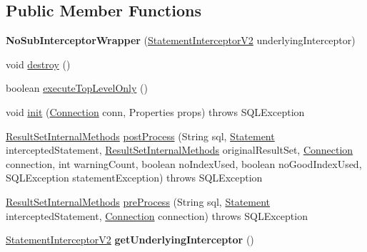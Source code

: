 \subsection*{Public Member Functions}
\begin{DoxyCompactItemize}
\item 
\mbox{\label{classcom_1_1mysql_1_1jdbc_1_1_no_sub_interceptor_wrapper_ac09c0d07ac9710d9d883a85132b03ec1}} 
{\bfseries No\+Sub\+Interceptor\+Wrapper} (\mbox{\hyperlink{interfacecom_1_1mysql_1_1jdbc_1_1_statement_interceptor_v2}{Statement\+Interceptor\+V2}} underlying\+Interceptor)
\item 
void \mbox{\hyperlink{classcom_1_1mysql_1_1jdbc_1_1_no_sub_interceptor_wrapper_ae579d5fb41efef1fff171752d736d4f5}{destroy}} ()
\item 
boolean \mbox{\hyperlink{classcom_1_1mysql_1_1jdbc_1_1_no_sub_interceptor_wrapper_a3688c515a37ae2f36b8f59ae51304ac4}{execute\+Top\+Level\+Only}} ()
\item 
void \mbox{\hyperlink{classcom_1_1mysql_1_1jdbc_1_1_no_sub_interceptor_wrapper_a7272676b9081fbf866a494f4d35b3a6d}{init}} (\mbox{\hyperlink{interfacecom_1_1mysql_1_1jdbc_1_1_connection}{Connection}} conn, Properties props)  throws S\+Q\+L\+Exception 
\item 
\mbox{\hyperlink{interfacecom_1_1mysql_1_1jdbc_1_1_result_set_internal_methods}{Result\+Set\+Internal\+Methods}} \mbox{\hyperlink{classcom_1_1mysql_1_1jdbc_1_1_no_sub_interceptor_wrapper_ad422f02c34900ee0adb87481762f09a7}{post\+Process}} (String sql, \mbox{\hyperlink{interfacecom_1_1mysql_1_1jdbc_1_1_statement}{Statement}} intercepted\+Statement, \mbox{\hyperlink{interfacecom_1_1mysql_1_1jdbc_1_1_result_set_internal_methods}{Result\+Set\+Internal\+Methods}} original\+Result\+Set, \mbox{\hyperlink{interfacecom_1_1mysql_1_1jdbc_1_1_connection}{Connection}} connection, int warning\+Count, boolean no\+Index\+Used, boolean no\+Good\+Index\+Used, S\+Q\+L\+Exception statement\+Exception)  throws S\+Q\+L\+Exception 
\item 
\mbox{\hyperlink{interfacecom_1_1mysql_1_1jdbc_1_1_result_set_internal_methods}{Result\+Set\+Internal\+Methods}} \mbox{\hyperlink{classcom_1_1mysql_1_1jdbc_1_1_no_sub_interceptor_wrapper_a60bc39ee3aaef8a088cecda8f0f5a831}{pre\+Process}} (String sql, \mbox{\hyperlink{interfacecom_1_1mysql_1_1jdbc_1_1_statement}{Statement}} intercepted\+Statement, \mbox{\hyperlink{interfacecom_1_1mysql_1_1jdbc_1_1_connection}{Connection}} connection)  throws S\+Q\+L\+Exception 
\item 
\mbox{\label{classcom_1_1mysql_1_1jdbc_1_1_no_sub_interceptor_wrapper_a7c04eb7fc48a329096ec9d40e666627d}} 
\mbox{\hyperlink{interfacecom_1_1mysql_1_1jdbc_1_1_statement_interceptor_v2}{Statement\+Interceptor\+V2}} {\bfseries get\+Underlying\+Interceptor} ()
\end{DoxyCompactItemize}


